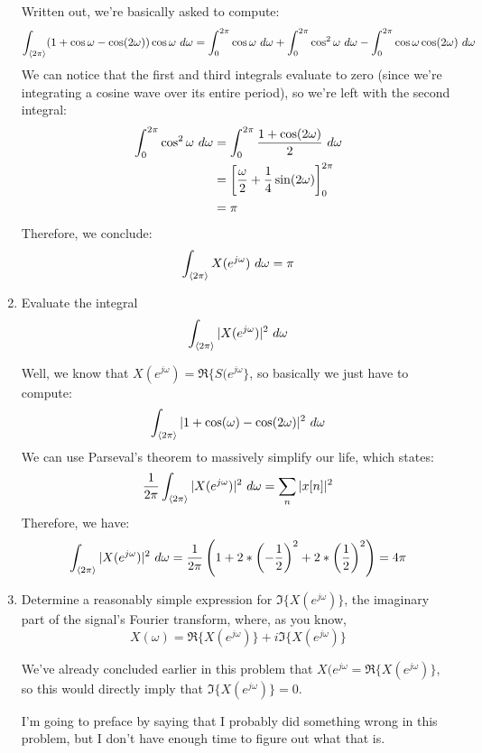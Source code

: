 \documentclass[10pt]{article}
\begin{document}
\begin{enumerate}[label=\alph*)]
			\begin{solution}
				Written out, we're basically asked to compute:
				\[
					\int_{\langle 2\pi \rangle}(1 + \cos \omega - \cos(2 \omega)) \cos \omega \ d \omega 
					= \int_{0}^{2\pi} \cos \omega \ d \omega + \int_{0}^{2\pi} \cos^2 \omega \ d  \omega
					- \int_{0}^{2\pi} \cos \omega \cos(2 \omega) \ d \omega 
				\] 
				We can notice that the first and third integrals evaluate to zero (since we're integrating 
				a cosine wave over its entire period), so we're left with the second integral:
				\begin{align*}
					\int_{0}^{2\pi} \cos^2  \omega \ d \omega &= \int_{0}^{2\pi} \frac{1 + \cos(2\omega)}{2}\ d 
					\omega\\
					&= \left[ \frac{\omega}{2} + \frac{1}{4}\sin(2 \omega) \right]_0^{2\pi}\\
					&= \pi 
				\end{align*}
				Therefore, we conclude:
				\[
					\int_{\langle 2\pi \rangle} X(e^{j \omega}) \ d \omega = \pi
				\] 
			\end{solution}
		\item Evaluate the integral 
			\[
				\int_{\langle 2\pi \rangle}|X(e^{j \omega})|^2 \ d  \omega
			\] 

			\begin{solution}
				Well, we know that \( X(e^{j \omega}) = \Re \{S(e^{ j \omega}\}  \), so basically we just have to 
				compute:
				\[
					\int_{\langle 2\pi \rangle}|1 + \cos(\omega) - \cos(2 \omega)|^2 \ d \omega
				\] 
				We can use Parseval's theorem to massively simplify our life, which states:
				\[
				\frac{1}{2\pi}	\int_{\langle 2\pi \rangle}|X(e^{j \omega})|^2 \ d \omega = \sum_n |x[n]|^2
				\]  
				Therefore, we have:
				\[
					\int_{\langle 2\pi \rangle} |X(e^{j \omega})|^2 \ d \omega = \frac{1}{2\pi}
					\left( 1 + 2 * \left( -\frac{1}{2} \right)^2 + 2 * \left( \frac{1}{2} \right)^2 \right) 
					= 4\pi
				\] 
			\end{solution}
		\item Determine a reasonably simple expression for \( \Im \{X(e^{j \omega}) \}  \), the imaginary part of the 
			signal's Fourier transform, where, as you know, 
			\[
			X(\omega) = \Re \{X(e^{ j \omega}) \} + i \Im \{X(e^{j \omega})\} 
			\] 

			\begin{solution}
				We've already concluded earlier in this problem that \( X(e^{j \omega} = \Re \{X(e^{j \omega})\} \), 
				so this would directly imply that \( \Im \{X(e^{j \omega}) \} = 0 \). 

				I'm going to preface by saying that I probably did something wrong in this problem, but I don't have 
				enough time to figure out what that is. 
			\end{solution}
	\end{enumerate}
	\pagebreak
\end{document}
